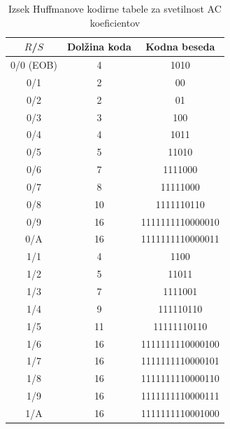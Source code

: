 \documentclass[a4paper,12pt,openright]{book}
\begin{document}
\begin{table}[htbp]
\centering
\begin{tabular}{|c|c|c|}
\hline
$R$/$S$& Dolžina koda& Kodna beseda\\
\hline
0/0 (EOB) &4 &1010\\
0/1       &2 &00\\
0/2       &2 &01\\
0/3       &3 &100\\
0/4       &4 &1011\\
0/5       &5 &11010\\
0/6       &7 &1111000\\
0/7       &8 &11111000\\
0/8       &10 &1111110110\\
0/9       &16 &1111111110000010\\
0/A       &16 &1111111110000011\\
1/1       &4 &1100\\
1/2       &5 &11011\\
1/3       &7 &1111001\\
1/4       &9 &111110110\\
1/5       &11 &11111110110\\
1/6       &16 &1111111110000100\\
1/7       &16 &1111111110000101\\
1/8       &16 &1111111110000110\\
1/9       &16 &1111111110000111\\
1/A       &16 &1111111110001000\\
\hline
\end{tabular}
\caption{Izsek Huffmanove kodirne tabele za svetilnost AC koeficientov}
\label{tab:Huffman_AC_luminance}
\end{table}
\end{document}
